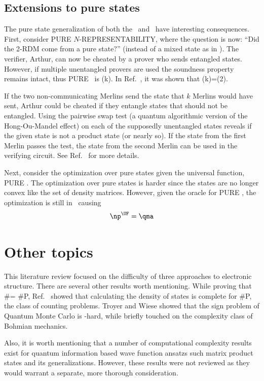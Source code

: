 \documentclass[11pt,oneside,final]{huthesis}%
\begin{document}
\subsection{Extensions to pure states} 
The pure state generalization of both the \REP~and \UF~have interesting consequences.  First, consider PURE $N$-REPRESENTABILITY, where the question is now: ``Did the 2-RDM come from a pure state?'' (instead of a mixed state as in \REP). The verifier, Arthur, can now be cheated by a prover who sends entangled states.  However, if multiple unentangled provers are used the soundness property remains intact, thus {PURE} \REP~is \qma(k). In  Ref.~\cite{Harrow10}, it was shown that \qma(k)=\qma(2).

If the two non-communicating Merlins send the state that $k$ Merlins would have sent, Arthur could be cheated if they entangle states that should not be entangled.  Using the pairwise swap test (a quantum algorithmic version of the Hong-Ou-Mandel effect) on each of the supposedly unentangled states reveals if the given state is not a product state (or nearly so).  If the state from the first Merlin passes the test, the state from the second Merlin can be used in the verifying circuit.  See Ref.~\cite{Harrow10} for more details.

Next, consider the optimization over pure states given the universal function, PURE \UF.  The optimization over pure states is harder since the states are no longer convex like the set of density matrices.  However, given the oracle for {PURE} \UF, the optimization is still in \np~causing \[\textrm{\np}^{\textrm{\UF}}=\textrm{\qma}\]

\section{Other topics}
This literature review focused on the difficulty of three approaches to electronic structure.  There are several other results worth mentioning.  While proving that \#\bqp = \#{P},  Ref.~\cite{Brown10complexity} showed that calculating the density of states is complete for \#{P}, the class of counting problems. Troyer and Wiese  \cite{Troyer05} showed that the sign problem of Quantum Monte Carlo is \np-hard, while \cite{Rassolov08} briefly touched on the complexity class of Bohmian mechanics.

Also, it is worth mentioning that a number of computational complexity results exist for quantum information based wave function ansatzs such matrix product states and its generalizations.  However, these results were not reviewed as they would warrant a separate, more thorough consideration.
\end{document}
